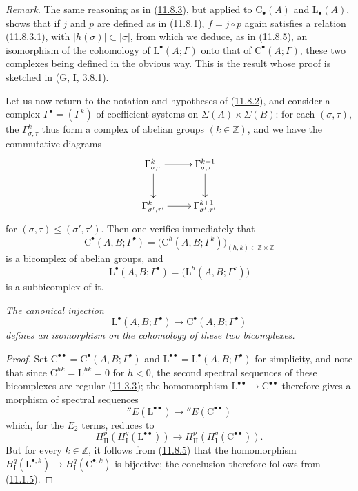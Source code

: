 \begin{env}[11.8.7]
\label{0.11.8.7}
\emph{Remark}. The same reasoning as in
(\hyperref[0.11.8.3]{11.8.3}), but applied to
$\mathrm C_\bullet(A)$ and $\mathrm L_\bullet(A)$, shows that if $j$ and $p$
are defined as in (\hyperref[0.11.8.1]{11.8.1}), $f=j\circ p$
again satisfies a relation (\hyperref[0.11.8.3.1]{11.8.3.1}), with
$|h(\sigma)|\subset|\sigma|$, from which we deduce, as in
(\hyperref[0.11.8.5]{11.8.5}), an isomorphism of the cohomology of
$\mathrm L^\bullet(A;\Gamma)$ onto that of
$\mathrm C^\bullet(A;\Gamma)$, these two complexes being defined in the
obvious way. This is the result whose proof is sketched in
(G, I, 3.8.1).
\end{env}

\begin{env}[11.8.8]
\label{0.11.8.8}
Let us now return to the notation and hypotheses of
(\hyperref[0.11.8.2]{11.8.2}), and consider a complex
$\Gamma^\bullet=(\Gamma^k)$ of coefficient systems on
$\Sigma(A)\times\Sigma(B)$: for each $(\sigma,\tau)$, the
$\Gamma^k_{\sigma,\tau}$ thus form a complex of abelian groups
$(k\in\mathbb Z)$, and we have the commutative diagrams
\[
\xymatrix{
\Gamma^k_{\sigma,\tau}\ar[r]\ar[d] &
\Gamma^{k+1}_{\sigma,\tau}\ar[d]\\
\Gamma^k_{\sigma',\tau'}\ar[r] &
\Gamma^{k+1}_{\sigma',\tau'}
}
\]
for $(\sigma,\tau)\leq(\sigma',\tau')$. Then one verifies immediately that
\[
\mathrm C^\bullet(A,B;\Gamma^\bullet)
=\bigl(\mathrm C^h(A,B;\Gamma^k)\bigr)_{(h,k)\in\mathbb Z\times\mathbb Z}
\]
is a bicomplex of abelian groups, and
\[
\mathrm L^\bullet(A,B;\Gamma^\bullet)
=\bigl(\mathrm L^h(A,B;\Gamma^k)\bigr)
\]
is a subbicomplex of it.
\end{env}

\begin{proposition}[11.8.9]
\label{0.11.8.9}
\emph{The canonical injection
\[
\mathrm L^\bullet(A,B;\Gamma^\bullet)\longrightarrow
\mathrm C^\bullet(A,B;\Gamma^\bullet)
\]
defines an isomorphism on the cohomology of these two bicomplexes.}
\end{proposition}

\begin{proof}
Set $\mathrm C^{\bullet\bullet}=
\mathrm C^\bullet(A,B;\Gamma^\bullet)$ and
$\mathrm L^{\bullet\bullet}=
\mathrm L^\bullet(A,B;\Gamma^\bullet)$ for simplicity, and note that
since $\mathrm C^{hk}=\mathrm L^{hk}=0$ for $h<0$, the second spectral
sequences of these bicomplexes are regular
(\hyperref[0.11.3.3]{11.3.3}); the homomorphism
$\mathrm L^{\bullet\bullet}\to\mathrm C^{\bullet\bullet}$ therefore gives a
morphism of spectral sequences
\[
{}''E(\mathrm L^{\bullet\bullet})\longrightarrow
{}''E(\mathrm C^{\bullet\bullet})
\]
which, for the $E_2$ terms, reduces to
\[
\label{0.11.8.9.1}
\tag{11.8.9.1}
H^p_{\mathrm{II}}(H^q_{\mathrm I}(\mathrm L^{\bullet\bullet}))
\longrightarrow
H^p_{\mathrm{II}}(H^q_{\mathrm I}(\mathrm C^{\bullet\bullet})).
\]
But for every $k\in\mathbb Z$, it follows from
(\hyperref[0.11.8.5]{11.8.5}) that the homomorphism
$H^q_{\mathrm I}(\mathrm L^{\bullet,k})\to
H^q_{\mathrm I}(\mathrm C^{\bullet,k})$ is bijective; the conclusion
therefore follows from (\hyperref[0.11.1.5]{11.1.5}).
\end{proof}

